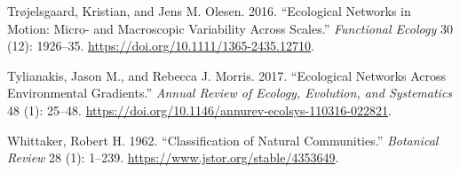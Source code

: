 \leavevmode\hypertarget{ref-TrojOles16}{}%
Trøjelsgaard, Kristian, and Jens M. Olesen. 2016. ``Ecological Networks
in Motion: Micro- and Macroscopic Variability Across Scales.''
\emph{Functional Ecology} 30 (12): 1926--35.
\url{https://doi.org/10.1111/1365-2435.12710}.

\leavevmode\hypertarget{ref-TyliMorr17}{}%
Tylianakis, Jason M., and Rebecca J. Morris. 2017. ``Ecological Networks
Across Environmental Gradients.'' \emph{Annual Review of Ecology,
Evolution, and Systematics} 48 (1): 25--48.
\url{https://doi.org/10.1146/annurev-ecolsys-110316-022821}.

\leavevmode\hypertarget{ref-Whit62}{}%
Whittaker, Robert H. 1962. ``Classification of Natural Communities.''
\emph{Botanical Review} 28 (1): 1--239.
\url{https://www.jstor.org/stable/4353649}.
